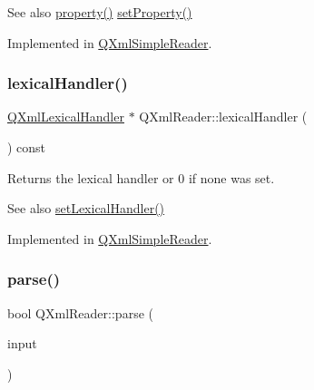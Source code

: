 \begin{DoxySeeAlso}{See also}
\mbox{\hyperlink{class_q_xml_reader_a88ea75a8b783f8ef6959d9d83402c579}{property()}} \mbox{\hyperlink{class_q_xml_reader_aa02ae81ff9636b9961bc333a68ecffa4}{set\+Property()}} 
\end{DoxySeeAlso}


Implemented in \mbox{\hyperlink{class_q_xml_simple_reader_ad93428643a263ad7dfc57f321cea65bb}{Q\+Xml\+Simple\+Reader}}.

\mbox{\label{class_q_xml_reader_ade3f9c1c3b56110187deab81cd837cd5}} 
\subsubsection{\texorpdfstring{lexicalHandler()}{lexicalHandler()}}
{\footnotesize\ttfamily \mbox{\hyperlink{class_q_xml_lexical_handler}{Q\+Xml\+Lexical\+Handler}} $\ast$ Q\+Xml\+Reader\+::lexical\+Handler (\begin{DoxyParamCaption}{ }\end{DoxyParamCaption}) const\hspace{0.3cm}{\ttfamily [pure virtual]}}

Returns the lexical handler or 0 if none was set.

\begin{DoxySeeAlso}{See also}
\mbox{\hyperlink{class_q_xml_reader_ab38c3816bacd14e3efcb8a5e0e5630be}{set\+Lexical\+Handler()}} 
\end{DoxySeeAlso}


Implemented in \mbox{\hyperlink{class_q_xml_simple_reader_a56cc7b748fc84448423a1d768e42befd}{Q\+Xml\+Simple\+Reader}}.

\mbox{\label{class_q_xml_reader_a5f7ba5edeea40d6042c63beab50866b2}} 
\subsubsection{\texorpdfstring{parse()}{parse()}}
{\footnotesize\ttfamily bool Q\+Xml\+Reader\+::parse (\begin{DoxyParamCaption}\item[{const \mbox{\hyperlink{class_q_xml_input_source}{Q\+Xml\+Input\+Source}} \&}]{input }\end{DoxyParamCaption})\hspace{0.3cm}{\ttfamily [pure virtual]}}

